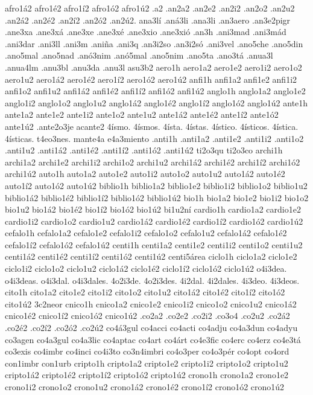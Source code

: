 {afro1á2 afro1é2 afro1í2 afro1ó2 afro1ú2
.a2
.an2a2
.an2e2
.an2i2
.an2o2
.an2u2
.an2á2
.an2é2
.an2í2
.an2ó2
.an2ú2.
ana3lí
.aná3li
.ana3li
.an3aero
.an3e2pigr
.ane3xa
.ane3xá
.ane3xe
.ane3xé
.ane3xio
.ane3xió
.an3h
.ani3mad
.ani3mád
.ani3dar
.ani3ll
.ani3m
.aniña
.ani3q
.an3i2so
.an3i2só
.ani3vel
.ano5che
.ano5din
.ano5mal
.ano5nad
.anó3nim
.anó5mal
.ano5nim
.ano5ta
.ano3tá
.anua3l
.anua4lm
.anu3bl
.anu3da
.anu3l
asu3b2
aero1h
aero1a2 aero1e2 aero1i2 aero1o2 aero1u2
aero1á2 aero1é2 aero1í2 aero1ó2 aero1ú2
anfi1h
anfi1a2 anfi1e2 anfi1i2 anfi1o2 anfi1u2
anfi1á2 anfi1é2 anfi1í2 anfi1ó2 anfi1ú2
anglo1h
anglo1a2 anglo1e2 anglo1i2 anglo1o2 anglo1u2
anglo1á2 anglo1é2 anglo1í2 anglo1ó2 anglo1ú2
ante1h
ante1a2 ante1e2 ante1i2 ante1o2 ante1u2
ante1á2 ante1é2 ante1í2 ante1ó2 ante1ú2
.ante2o3je
acante2
4ísmo.
4ísmos.
4ísta.
4ístas.
4ístico.
4ísticos.
4ística.
4ísticas.
t4eo3nes.
mante4a
e4a3miento
.anti1h
.anti1a2 .anti1e2 .anti1i2 .anti1o2 .anti1u2
.anti1á2 .anti1é2 .anti1í2 .anti1ó2 .anti1ú2
ti2o3qu
ti2o3co
archi1h
archi1a2 archi1e2 archi1i2 archi1o2 archi1u2
archi1á2 archi1é2 archi1í2 archi1ó2 archi1ú2
auto1h
auto1a2 auto1e2 auto1i2 auto1o2 auto1u2
auto1á2 auto1é2 auto1í2 auto1ó2 auto1ú2
biblio1h
biblio1a2 biblio1e2 biblio1i2 biblio1o2 biblio1u2
biblio1á2 biblio1é2 biblio1í2 biblio1ó2 biblio1ú2
bio1h
bio1a2 bio1e2 bio1i2 bio1o2 bio1u2
bio1á2 bio1é2 bio1í2 bio1ó2 bio1ú2
bi1u2ní
cardio1h
cardio1a2 cardio1e2 cardio1i2 cardio1o2 cardio1u2
cardio1á2 cardio1é2 cardio1í2 cardio1ó2 cardio1ú2
cefalo1h
cefalo1a2 cefalo1e2 cefalo1i2 cefalo1o2 cefalo1u2
cefalo1á2 cefalo1é2 cefalo1í2 cefalo1ó2 cefalo1ú2
centi1h
centi1a2 centi1e2 centi1i2 centi1o2 centi1u2
centi1á2 centi1é2 centi1í2 centi1ó2 centi1ú2
centi5área
ciclo1h
ciclo1a2 ciclo1e2 ciclo1i2 ciclo1o2 ciclo1u2
ciclo1á2 ciclo1é2 ciclo1í2 ciclo1ó2 ciclo1ú2
o4i3dea.
o4i3deas.
o4i3dal.
o4i3dales.
4o2i3de.
4o2i3des.
4i2dal.
4i2dales.
4i3deo.
4i3deos.
cito1h
cito1a2 cito1e2 cito1i2 cito1o2 cito1u2
cito1á2 cito1é2 cito1í2 cito1ó2 cito1ú2
3c2neor
cnico1h
cnico1a2 cnico1e2 cnico1i2 cnico1o2 cnico1u2
cnico1á2 cnico1é2 cnico1í2 cnico1ó2 cnico1ú2
.co2a2
.co2e2
.co2i2
.co3o4
.co2u2
.co2á2
.co2é2
.co2í2
.co2ó2
.co2ú2
co4á3gul
co4acci
co4acti
co4adju
co4a3dun
co4adyu
co3agen
co4a3gul
co4a3lic
co4aptac
co4art
co4árt
co4e3fic
co4erc
co4erz
co4e3tá
co3exis
co4imbr
co4inci
co4i3to
co3n4imbri
co4o3per
co4o3pér
co4opt
co4ord
con1imbr
con1urb
cripto1h
cripto1a2 cripto1e2 cripto1i2 cripto1o2 cripto1u2
cripto1á2 cripto1é2 cripto1í2 cripto1ó2 cripto1ú2
crono1h
crono1a2 crono1e2 crono1i2 crono1o2 crono1u2
crono1á2 crono1é2 crono1í2 crono1ó2 crono1ú2
}
